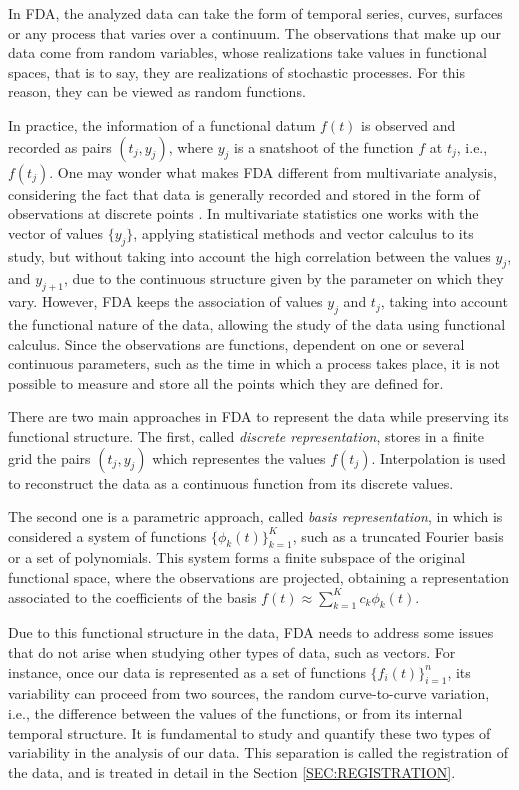 In \acs{FDA}, the analyzed data can take the form of temporal series, curves,
surfaces or any process that varies over a continuum. The observations that
make up our data come from random variables, whose realizations take
values in functional spaces, that is to say, they are realizations of
stochastic processes. For this reason, they can be viewed as random functions.

In practice, the information of a functional datum $f(t)$ is observed and
recorded as pairs $(t_j, y_j)$, where $y_j$ is a snatshoot of the
function $f$ at $t_j$, i.e., $f(t_j)$.
One may wonder what makes \acs{FDA} different from multivariate analysis, considering
the fact that data is generally recorded and stored in the form of
observations at discrete points \cite{Srivastava2016}.
In multivariate statistics one works with the vector of values $\{y_j\}$,
applying statistical methods and vector calculus to its study,
but without taking into account the high correlation between the values
$y_j$, and $y_{j+1}$, due to the continuous structure given by the parameter on
which they vary.
However, \acs{FDA} keeps the association of
values ${y_j}$ and ${t_j}$, taking into account the functional nature of the
data, allowing the study of the data using functional calculus.
Since the observations are functions, dependent on one or several continuous
parameters, such as the time in which a process takes place, it is not
possible to measure and store all the points which they are defined for.

There are two main approaches in \acs{FDA} to represent the data while preserving its
functional structure. The first, called \textit{discrete representation}, stores
in a finite grid the pairs $(t_j, y_j)$ which representes the values $f(t_j)$.
Interpolation is used to reconstruct the data as a continuous function from its discrete values.

The second one is a parametric approach, called \textit{basis representation},
in which is considered a system of functions $\{\phi_k(t) \}_{k=1}^K$, such as a
truncated Fourier basis or a set of polynomials. This system forms a finite
subspace of the original functional space, where the
observations are projected, obtaining a representation associated to the
coefficients of the basis $f(t) \approx \sum_{k=1}^K c_k\phi_k(t)$.

Due to this functional structure in the data,
\acs{FDA} needs to address some issues that do not arise when studying other types of
data, such as vectors.
For instance, once our data is represented as a set of functions
$\{f_i(t)\}_{i=1}^{n}$, its variability can proceed from two sources,
the random curve-to-curve variation, i.e., the difference between the values of
the functions, or from its internal temporal structure.
It is fundamental to study and quantify these two types of variability in
the analysis of our data. This separation is called the registration of the data,
and is treated in detail in the Section \ref{SEC:REGISTRATION}.

